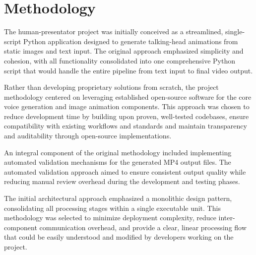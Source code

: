 
\section{Methodology}

The human-presentator project was initially conceived as a streamlined, single-script Python
application designed to generate talking-head animations from static images and text input. The
original approach emphasized simplicity and cohesion, with all functionality consolidated into one
comprehensive Python script that would handle the entire pipeline from text input to final video
output.

Rather than developing proprietary solutions from scratch, the project methodology centered on
leveraging established open-source software for the core voice generation and image animation
components. This approach was chosen to reduce development time by building upon proven, well-tested
codebases, ensure compatibility with existing workflows and standards and maintain transparency and
auditability through open-source implementations.

An integral component of the original methodology included implementing automated validation
mechanisms for the generated MP4 output files. The automated validation approach aimed to ensure
consistent output quality while reducing manual review overhead during the development and testing
phases.

The initial architectural approach emphasized a monolithic design pattern, consolidating all
processing stages within a single executable unit. This methodology was selected to minimize
deployment complexity, reduce inter-component communication overhead, and provide a clear, linear
processing flow that could be easily understood and modified by developers working on the project.
